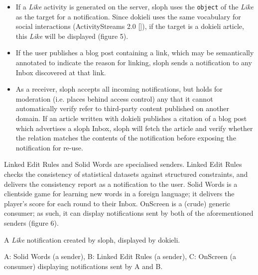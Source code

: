                             \begin{itemize}
  \item If a {\em Like} activity is generated on the server, sloph uses the {\tt object} of the {\em Like} as the target for a notification. Since dokieli uses the same vocabulary for social interactions (\empty ActivityStreams 2.0 []), if the target is a dokieli article, this {\em Like} will be displayed (\empty figure 5).\item If the user publishes a blog post containing a link, which may be semantically annotated to indicate the reason for linking, sloph sends a notification to any Inbox discovered at that link.\item As a receiver, sloph accepts all incoming notifications, but holds for moderation (i.e. places behind access control) any that it cannot automatically verify refer to third-party content published on another domain. If an article written with dokieli publishes a citation of a blog post which advertises a sloph Inbox, sloph will fetch the article and verify whether the relation matches the contents of the notification before exposing the notification for re-use.
    \end{itemize}
  

                            
\par \empty Linked Edit Rules and \empty Solid Words are specialised senders. Linked Edit Rules checks the consistency of statistical datasets against structured constraints, and delivers the consistency report as a notification to the user. Solid Words is a clientside game for learning new words in a foreign language; it delivers the player’s score for each round to their Inbox. \empty OnScreen is a (crude) generic consumer; as such, it can display notifications sent by both of the aforementioned senders (\empty figure 6).

                            
                                
                                A {\em Like} notification created by sloph, displayed by dokieli.
                            

                            
                                
                                A: Solid Words (a sender), B: Linked Edit Rules (a sender), C: OnScreen (a consumer) displaying notifications sent by A and B.
                            
                        
                    

